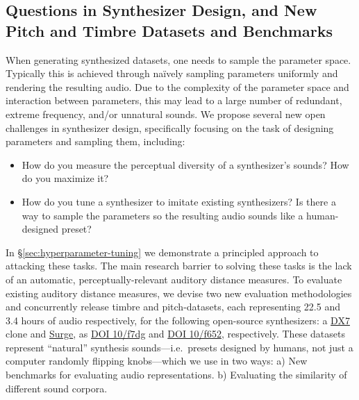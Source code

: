 

\subsection{Questions in Synthesizer Design, and New Pitch and Timbre Datasets and Benchmarks}

When generating synthesized datasets, one needs to sample the parameter space. Typically this is achieved through na\"ively sampling parameters uniformly and rendering the resulting audio. Due to the complexity of the parameter space and interaction between parameters, this may lead to a large number of redundant, extreme frequency, and/or unnatural sounds. We propose several new open challenges in synthesizer design, specifically focusing on the task of designing parameters and sampling them, including:
\begin{itemize}
    \item How do you measure the perceptual diversity of a synthesizer's sounds? How do you maximize it?
    \item How do you tune a synthesizer to imitate existing synthesizers? Is there a way to sample the parameters so the resulting audio sounds like a human-designed preset?
\end{itemize}
In \S\ref{sec:hyperparameter-tuning} we demonstrate a principled approach to attacking these tasks. The main research barrier to solving these tasks is the lack of an automatic, perceptually-relevant auditory distance measures.
To evaluate existing auditory distance measures, we devise two new evaluation methodologies and concurrently release timbre and pitch-datasets, each representing 22.5 and 3.4 hours of audio respectively, for the following open-source synthesizers: a \href{https://github.com/bwhitman/learnfm}{DX7} clone and \href{https://surge-synthesizer.github.io/}{Surge}, as \href{https://zenodo.org/record/4677102}{DOI 10/f7dg} and \href{https://zenodo.org/record/4677097}{DOI 10/f652}, respectively. These datasets represent ``natural'' synthesis sounds---i.e.\ presets designed by humans, not just a computer randomly flipping knobs---which we use in two ways: a) New benchmarks for evaluating audio representations. b) Evaluating the similarity of different sound corpora.


